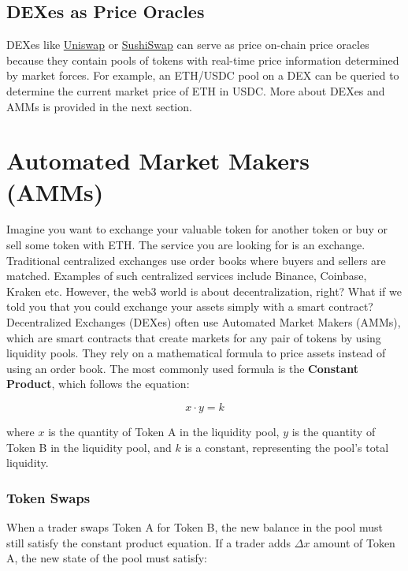 \documentclass[12pt]{article}
\begin{document}
\subsection*{DEXes as Price Oracles}

DEXes like \href{https://app.uniswap.org/}{Uniswap} or \href{https://www.sushi.com/ethereum/swap}{SushiSwap} can serve as price on-chain price oracles because they contain pools of tokens with real-time price information determined by market forces. For example, an ETH/USDC pool on a DEX can be queried to determine the current market price of ETH in USDC. More about DEXes and AMMs is provided in the next section.

\newpage
\section{Automated Market Makers (AMMs)}

Imagine you want to exchange your valuable token for another token or buy or sell some token with ETH. The service you are looking for is an exchange. Traditional centralized exchanges use order books where buyers and sellers are matched. Examples of such centralized services include Binance, Coinbase, Kraken etc. However, the web3 world is about decentralization, right? What if we told you that you could exchange your assets simply with a smart contract? Decentralized Exchanges (DEXes) often use Automated Market Makers (AMMs), which are smart contracts that create markets for any pair of tokens by using liquidity pools. They rely on a mathematical formula to price assets instead of using an order book. The most commonly used formula is the \textbf{Constant Product}, which follows the equation:



\begin{equation}
  x \cdot y = k
\end{equation}

where \( x \) is the quantity of Token A in the liquidity pool, \( y \) is the quantity of Token B in the liquidity pool, and \( k \) is a constant, representing the pool's total liquidity.

\subsubsection*{Token Swaps}
When a trader swaps Token A for Token B, the new balance in the pool must still satisfy the constant product equation. If a trader adds \( \Delta x \) amount of Token A, the new state of the pool must satisfy:
\end{document}
